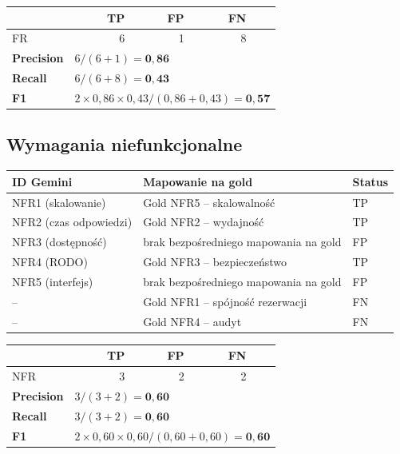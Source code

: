 \documentclass[12pt,a4paper]{article}
\newcommand{\tp}[1]{\colorbox{tpcolor}{\small #1}}
\newcommand{\fp}[1]{\colorbox{fpcolor}{\small #1}}
\newcommand{\fn}[1]{\colorbox{fncolor}{\small #1}}
\begin{document}
\vspace{0.5em}
\begin{tabular}{lrrrr}
\toprule
& \textbf{TP} & \textbf{FP} & \textbf{FN} & \\
\midrule
FR & 6 & 1 & 8 & \\
\midrule
\textbf{Precision} & \multicolumn{4}{l}{$6 / (6+1) = \mathbf{0{,}86}$} \\
\textbf{Recall}    & \multicolumn{4}{l}{$6 / (6+8) = \mathbf{0{,}43}$} \\
\textbf{F1}        & \multicolumn{4}{l}{$2 \times 0{,}86 \times 0{,}43 / (0{,}86+0{,}43) = \mathbf{0{,}57}$} \\
\bottomrule
\end{tabular}

\vspace{1em}
\subsection{Wymagania niefunkcjonalne}

\begin{tabular}{p{2.5cm} p{7cm} l}
\toprule
\textbf{ID Gemini} & \textbf{Mapowanie na gold} & \textbf{Status} \\
\midrule
NFR1 (skalowanie)    & Gold NFR5 -- skalowalność & \tp{TP} \\
NFR2 (czas odpowiedzi)     & Gold NFR2 -- wydajność & \tp{TP} \\
NFR3 (dostępność)        & brak bezpośredniego mapowania na gold & \fp{FP} \\
NFR4 (RODO)           & Gold NFR3 -- bezpieczeństwo  & \tp{TP} \\
NFR5 (interfejs)        & brak bezpośredniego mapowania na gold & \fp{FP} \\
\midrule
-- & Gold NFR1 -- spójność rezerwacji & \fn{FN} \\
-- & Gold NFR4 -- audyt & \fn{FN} \\
\bottomrule
\end{tabular}

\vspace{0.5em}
\begin{tabular}{lrrrr}
\toprule
& \textbf{TP} & \textbf{FP} & \textbf{FN} & \\
\midrule
NFR & 3 & 2 & 2 & \\
\midrule
\textbf{Precision} & \multicolumn{4}{l}{$3 / (3+2) = \mathbf{0{,}60}$} \\
\textbf{Recall}    & \multicolumn{4}{l}{$3 / (3+2) = \mathbf{0{,}60}$} \\
\textbf{F1}        & \multicolumn{4}{l}{$2 \times 0{,}60 \times 0{,}60 / (0{,}60+0{,}60) = \mathbf{0{,}60}$} \\
\bottomrule
\end{tabular}
\end{document}
